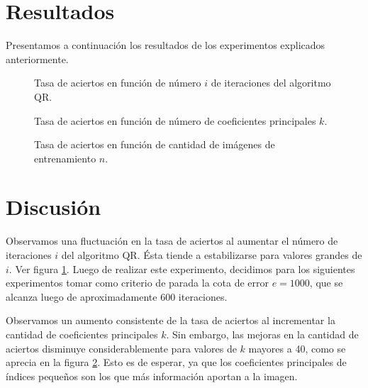 \documentclass[a4paper,10pt,twoside]{article}
\begin{document}
\section{Resultados}


Presentamos a continuación los resultados de los experimentos explicados anteriormente.

\begin{figure}[H]
  \centering
  
  \caption{Tasa de aciertos en función de número $i$ de iteraciones del algoritmo QR.}
  \label{tasas-vs-iteraciones}
\end{figure}

\begin{figure}[H]
  \centering
  
  \caption{Tasa de aciertos en función de número de coeficientes principales $k$.}
  \label{tasas-vs-k}
\end{figure}

\begin{figure}[H]
  \centering
  
  \caption{Tasa de aciertos en función de cantidad de imágenes de entrenamiento $n$.}
  \label{tasas-vs-imagenes}
\end{figure}




\section{Discusión}

Observamos una fluctuación en la tasa de aciertos al aumentar el número de iteraciones $i$ del algoritmo QR. Ésta tiende a estabilizarse para valores grandes de $i$. Ver figura \ref{tasas-vs-iteraciones}. Luego de realizar este experimento, decidimos para los siguientes experimentos tomar como criterio de parada la cota de error $e = 1000$, que se alcanza luego de aproximadamente 600 iteraciones.

Observamos un aumento consistente de la tasa de aciertos al incrementar la cantidad de coeficientes principales $k$. Sin embargo, las mejoras en la cantidad de aciertos disminuye considerablemente para valores de $k$ mayores a 40, como se aprecia en la figura \ref{tasas-vs-k}. Esto es de esperar, ya que los coeficientes principales de índices pequeños son los que más información aportan a la imagen.
\end{document}
